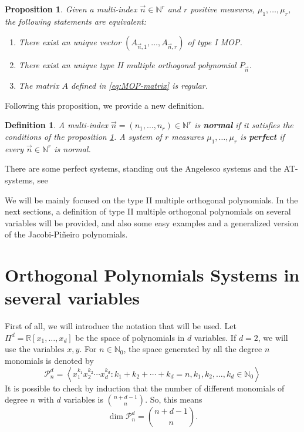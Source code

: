 \documentclass[12pt,a4]{article}
\theoremstyle{plain}
\newtheorem{proposition}[theorem]{Proposition}
\newtheorem{definition}[theorem]{Definition}
\newcommand{\R}[0]{\mathbb{R}}
\newcommand{\N}[0]{\mathbb{N}}
\begin{document}
\begin{proposition}
    \label{prop:existence-of-MOP}
    Given a multi-index $\vec n\in\N^r$ and $r$ positive measures, $\mu_1,\dots,\mu_r$, the following statements are equivalent:
    \begin{enumerate}
        \item There exist an unique vector $(A_{\vec n,1}, \dots, A_{\vec n,r})$ of type I MOP.
        \item There exist an unique type II multiple orthogonal polynomial $P_{\vec n}$.
        \item The matrix $A$ defined in \eqref{eq:MOP-matrix} is regular.
    \end{enumerate}
\end{proposition}

Following this proposition, we provide a new definition.

\begin{definition}
    A multi-index $\vec n = (n_1,\dots,n_r)\in\N^r$ is \textbf{normal} if it satisfies the conditions of the proposition \ref{prop:existence-of-MOP}.
    A system of $r$ measures $\mu_1,\dots,\mu_r$ is \textbf{perfect} if every $\vec n\in\N^r$ is normal.
\end{definition}

There are some perfect systems, standing out the Angelesco systems and the AT-systems, see \cite[Sections 23.1.1 and 23.1.2]{Ismail}

We will be mainly focused on the type II multiple orthogonal polynomials. In the next sections, a definition of type II multiple orthogonal polynomials on several variables will be provided, and also some easy examples and a generalized version of the Jacobi-Piñeiro polynomials. 

\section{Orthogonal Polynomials Systems in several variables}

First of all, we will introduce the notation that will be used. Let $\Pi^d=\R[x_1,\dots,x_d]$ be the space of polynomials in $d$ variables. If $d=2$, we will use the variables $x,y$. For $n\in\N_0$, the space generated by all the degree $n$ monomials is denoted by 
$$
\mathcal{P}_n^d = \left\langle x_1^{k_1} x_2^{k_2} \cdots x_d^{k_d}: k_1+k_2+\cdots +k_d = n, k_1,k_2,\dots,k_d\in\N_0\right\rangle
$$
It is possible to check by induction that the number of different monomials of degree $n$ with $d$ variables is $\displaystyle\binom{n+d-1}{n}$. So, this means
$$
\dim \mathcal{P}_n^d = \binom{n+d-1}{n}.
$$
\end{document}
